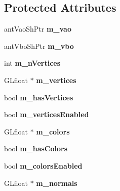 \subsection*{Protected Attributes}
\begin{DoxyCompactItemize}
\item 
\hypertarget{classant_drawable_a44467c7a66f32ecc52de456ec65d4ecf}{ant\+Vao\+Sh\+Ptr {\bfseries m\+\_\+vao}}\label{classant_drawable_a44467c7a66f32ecc52de456ec65d4ecf}

\item 
\hypertarget{classant_drawable_a115e4aa45582fefe01f5fd7e8ba81c1c}{ant\+Vbo\+Sh\+Ptr {\bfseries m\+\_\+vbo}}\label{classant_drawable_a115e4aa45582fefe01f5fd7e8ba81c1c}

\item 
\hypertarget{classant_drawable_a00f537df3d1eed56d18c41f21f77dd4c}{int {\bfseries m\+\_\+n\+Vertices}}\label{classant_drawable_a00f537df3d1eed56d18c41f21f77dd4c}

\item 
\hypertarget{classant_drawable_afd6edb277d05fd04e633b8f7e8918f18}{G\+Lfloat $\ast$ {\bfseries m\+\_\+vertices}}\label{classant_drawable_afd6edb277d05fd04e633b8f7e8918f18}

\item 
\hypertarget{classant_drawable_a289640b95bc5e0a5a3965788945c27c3}{bool {\bfseries m\+\_\+has\+Vertices}}\label{classant_drawable_a289640b95bc5e0a5a3965788945c27c3}

\item 
\hypertarget{classant_drawable_a4ad2abc29a7bb97094f94917971ece04}{bool {\bfseries m\+\_\+vertices\+Enabled}}\label{classant_drawable_a4ad2abc29a7bb97094f94917971ece04}

\item 
\hypertarget{classant_drawable_a9cd5939ef8624ce765cadded921a8e6e}{G\+Lfloat $\ast$ {\bfseries m\+\_\+colors}}\label{classant_drawable_a9cd5939ef8624ce765cadded921a8e6e}

\item 
\hypertarget{classant_drawable_a554bfc525b6cb26d6c33fc7176b96596}{bool {\bfseries m\+\_\+has\+Colors}}\label{classant_drawable_a554bfc525b6cb26d6c33fc7176b96596}

\item 
\hypertarget{classant_drawable_addcb899b2071b0b87e2aa21f86873425}{bool {\bfseries m\+\_\+colors\+Enabled}}\label{classant_drawable_addcb899b2071b0b87e2aa21f86873425}

\item 
\hypertarget{classant_drawable_a43c390b562c431ded8b76f5ddba2ff03}{G\+Lfloat $\ast$ {\bfseries m\+\_\+normals}}\label{classant_drawable_a43c390b562c431ded8b76f5ddba2ff03}


\end{DoxyCompactItemize}
